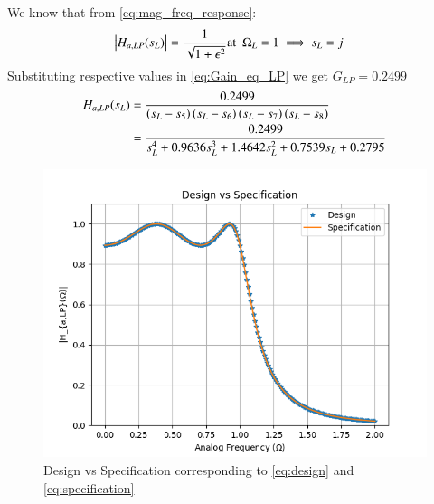 \documentclass{article}
\begin{document}
\begin{enumerate}
We know that from \eqref{eq:mag_freq_response}:-
\begin{align}
    \left\vert H_{a,LP}(s_L)\right\vert &= \frac{1}{\sqrt{1+\epsilon^2}} \text{at} \hspace{5pt} \Omega_{L}=1 \implies s_{L} = j \label{eq:Gain_eq_LP} 
\end{align}
Substituting respective values in \eqref{eq:Gain_eq_LP} we get $G_{LP}=0.2499$
\begin{align}
     H_{a,LP}(s_L) &= \frac{0.2499}{\left(s_L-s_5\right)\left(s_L-s_6\right)\left(s_L-s_7\right)\left(s_L-s_8\right)}\\
     &= \frac{0.2499}{s_L^4 + 0.9636s_L^3 + 1.4642s_L^2+0.7539s_L + 0.2795}\label{eq:design}
\end{align}
\begin{figure}[H]
\centering
\includegraphics[width=1\columnwidth]{figs/Design_vs_Specification.png}
\caption{Design vs Specification corresponding to \eqref{eq:design} and \eqref{eq:specification}}
\label{fig:design_vs_specf}
\end{figure}


\end{enumerate}
\end{document}
